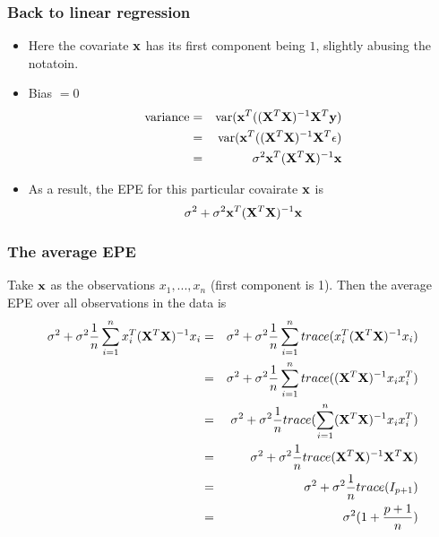 \documentclass{beamer}
\def\var{{\rm var}}
\def\bfX{{\bf X}}
\def\bfx{{\bf x}}
\def\bfy{{\bf y}}
\begin{document}
      
      \begin{frame} 
      	\frametitle{Back to linear regression}
      	
      	\begin{itemize}
      		\item Here the covariate $\bfx$ has its first component being $1$, slightly abusing the notatoin.
      		\item Bias $ = 0$
      		\begin{eqnarray*}
      			\hbox{variance} &=& \var ( \bfx^T((\bfX^T \bfX)^{-1} \bfX^T \bfy) \\
      			&=& \var ( \bfx^T((\bfX^T \bfX)^{-1} \bfX^T {\bf \epsilon} )  \\
      			&=&  \sigma^2 \bfx^T (\bfX^T \bfX)^{-1} \bfx
      		\end{eqnarray*}
      		
      		\item 	As a result, the EPE  for this particular covairate $\bfx$ is
      		$$\sigma^2 + \sigma^2 \bfx^T (\bfX^T \bfX)^{-1} \bfx$$
      	\end{itemize}
      \end{frame}
    
       
      \begin{frame} 
      	\frametitle{The average EPE }
      	
      	 Take $\bfx$ as the observations $x_1, ..., x_n$ (first component is 1). Then the average EPE over all
      	 observations in the data is
      	 	\begin{eqnarray*}
      	 		 \sigma^2 + \sigma^2 {1 \over n } \sum_{i=1}^n  x^T_i (\bfX^T \bfX)^{-1} x_i   
      	 		&=& \sigma^2 + \sigma^2 {1 \over n } \sum_{i=1}^n trace( x^T_i (\bfX^T \bfX)^{-1} x_i ) \\
      	 		&=& \sigma^2 + \sigma^2 {1 \over n } \sum_{i=1}^n trace(  (\bfX^T \bfX)^{-1} x_i x^T_i ) \\
      	 		&=& \sigma^2 + \sigma^2 {1 \over n } trace ( \sum_{i=1}^n    (\bfX^T \bfX)^{-1} x_i x^T_i ) \\
      	 		&=&   \sigma^2 + \sigma^2 {1 \over n } trace   (\bfX^T \bfX)^{-1} \bfX^T\bfX ) \\
      	 		&=& \sigma^2 + \sigma^2 {1 \over n }  trace (I_{p+1}) \\
      	 		&=& \sigma^2 ( 1 + {p+1  \over n} )   
      	 	\end{eqnarray*}
      \end{frame}
      
\end{document}
